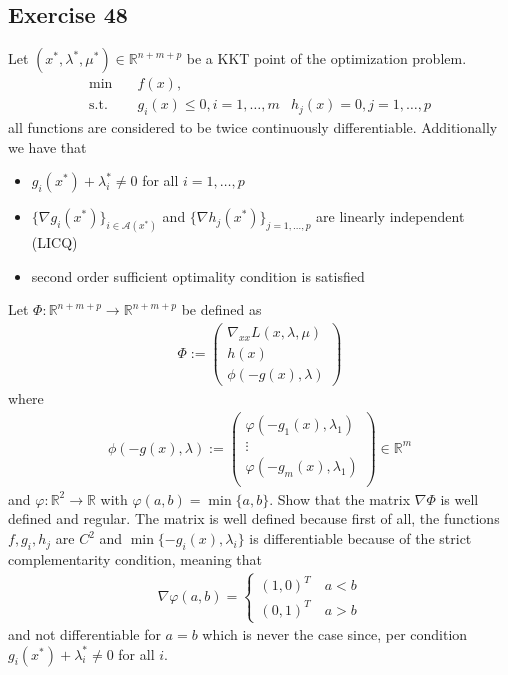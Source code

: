 \subsection{Exercise 48}
Let $(x^{*}, \lambda^{*}, \mu^{*}) \in \mathbb{R}^{n + m + p}$ be a
KKT point of the optimization problem.
\begin{align}
    \text{min}\quad &f(x),\\
    \text{s.t.}\quad & g_i(x) \le 0, i=1,\ldots,m \nonumber
                     &h_j(x) =0, j=1,\ldots,p \nonumber
\end{align}
all functions are considered to be twice continuously differentiable.
Additionally we have that
\begin{itemize}
    \item $g_i(x^{*}) + \lambda^{*}_i \neq 0$ for all $i=1,\ldots,p$
    \item $\{\nabla g_i(x^{*})\}_{i\in \mathcal{A}(x^{*})}$ and $\{\nabla
        h_j(x^{*})\}_{j=1,\ldots,p}$ are linearly independent (LICQ)
    \item second order sufficient optimality condition is satisfied
\end{itemize}
Let $\Phi: \mathbb{R}^{n+m+p}\to \mathbb{R}^{n+m+p}$ be defined as
\begin{align}
   \Phi  :=
   \begin{pmatrix}
       \nabla_{x x} L(x,\lambda ,\mu)\\
       h(x)\\
       \phi(-g(x), \lambda)
   \end{pmatrix}
\end{align}
where
\begin{align}
    \phi(-g(x), \lambda) :=
    \begin{pmatrix}
        \varphi(-g_1(x), \lambda_1)\\
        \vdots\\
        \varphi(-g_m(x), \lambda_1)\\
    \end{pmatrix} \in \mathbb{R}^{m}
\end{align}
and $\varphi:\mathbb{R}^{2} \to \mathbb{R}$ with $\varphi(a,b) = \min \{a,
b\}$. Show that the matrix $\nabla \Phi$ is well defined and regular.
\newline
The matrix is well defined because first of all, the functions $f, g_i, h_j$
are $C^{2}$ and $\min \{-g_i(x), \lambda_i\}$ is differentiable because of
the strict complementarity condition, meaning that
\begin{align}
    \nabla \varphi(a, b) =
    \begin{cases}
        (1, 0)^{T}\quad a<b\\
        (0, 1)^{T}\quad a>b
    \end{cases}
\end{align}
and not differentiable for $a=b$ which is never the case since, per condition
$g_i(x^{*}) + \lambda_i^{*} \neq 0$ for all $i$.

